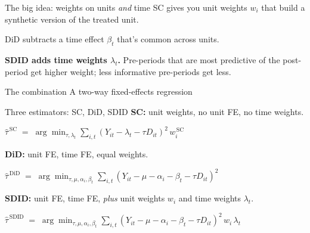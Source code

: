 \documentclass[aspectratio=169,11pt]{beamer}
\begin{document}
\begin{frame}{The big idea: weights on units \textit{and} time}
\vspace{0.7em}
SC gives you unit weights $w_i$ that build a synthetic version of the treated unit.

\vspace{0.5em}
DiD subtracts a time effect $\beta_t$ that's common across units.

\vspace{0.7em}
\textbf{SDID adds time weights $\lambda_t$.} \;Pre-periods that are most predictive of the post-period get higher weight; less informative pre-periods get less.

\vspace{0.6em}
\begin{block}{The combination}
\centering
A two-way fixed-effects regression \;
\end{block}

\vspace{0.4em}
\end{frame}

\begin{frame}{Three estimators: SC, DiD, SDID}
\vspace{0.4em}
\textbf{SC:} \;unit weights, no unit FE, no time weights.
\vspace{0.2em}
\begin{center}\small
$\widehat{\tau}^{\,\text{SC}} \;=\; \displaystyle\arg\min_{\tau, \lambda_t}\sum_{i,t} (Y_{it} - \lambda_t - \tau D_{it})^2 \,w_i^{\,\text{SC}}$
\end{center}

\vspace{0.6em}
\textbf{DiD:} \;unit FE, time FE, equal weights.
\vspace{0.2em}
\begin{center}\small
$\widehat{\tau}^{\,\text{DiD}} \;=\; \displaystyle\arg\min_{\tau, \mu, \alpha_i, \beta_t}\sum_{i,t} (Y_{it} - \mu - \alpha_i - \beta_t - \tau D_{it})^2$
\end{center}

\vspace{0.6em}
\textbf{SDID:} \;unit FE, time FE, \textit{plus} unit weights $w_i$ and time weights $\lambda_t$.
\vspace{0.2em}
\begin{center}\small
$\widehat{\tau}^{\,\text{SDID}} \;=\; \displaystyle\arg\min_{\tau, \mu, \alpha_i, \beta_t}\sum_{i,t} (Y_{it} - \mu - \alpha_i - \beta_t - \tau D_{it})^2 \,w_i \,\lambda_t$
\end{center}

\vspace{0.4em}
\end{frame}
\end{document}
